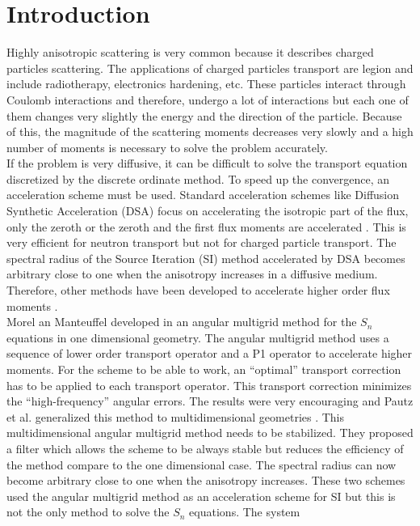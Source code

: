 \section{Introduction}
Highly anisotropic scattering is very common because it describes charged
particles scattering. The applications of charged particles transport are
legion and include radiotherapy, electronics hardening, etc. These particles 
interact through Coulomb interactions and therefore, undergo a lot of interactions 
but each one of them changes very slightly the energy and the direction of the 
particle. Because of this, the magnitude of the scattering moments decreases 
very slowly and a high number of moments is necessary to solve the problem 
accurately.\\
If the problem is very diffusive, it can be difficult to solve the transport
equation discretized by the discrete ordinate method. To speed up the
convergence, an acceleration scheme must be used. Standard acceleration schemes 
like Diffusion Synthetic Acceleration (DSA) focus on accelerating the isotropic 
part of the flux, only the zeroth or the zeroth and the first flux 
moments are accelerated \cite{adams}. This is very efficient for neutron transport 
but not for charged particle transport. The spectral radius of the Source
Iteration (SI) method accelerated by DSA becomes arbitrary close to one when the 
anisotropy increases in a diffusive medium. Therefore, other methods have been 
developed to accelerate higher order flux moments 
\cite{kassem,multigrid_1d,multigrid_2d}.\\
Morel an Manteuffel developed in \cite{multigrid_1d} an angular multigrid
method for the $S_n$ equations in one dimensional geometry. The angular
multigrid method uses a sequence of lower order transport operator and a
P1 operator to accelerate higher moments. For the scheme to be able to
work, an ``optimal'' transport correction has to be applied to each transport
operator. This transport correction minimizes the ``high-frequency'' angular
errors. The results were very encouraging and Pautz et al. generalized this method 
to multidimensional geometries \cite{multigrid_2d}. This multidimensional
angular multigrid method needs to be stabilized. They proposed a 
filter which allows the scheme to be always stable but reduces the 
efficiency of the method compare to the one dimensional case. The spectral 
radius can now become arbitrary close to one when the anisotropy increases.
These two schemes used the angular multigrid method as an acceleration scheme
for SI but this is not the only method to solve the $S_n$ equations. The system 
